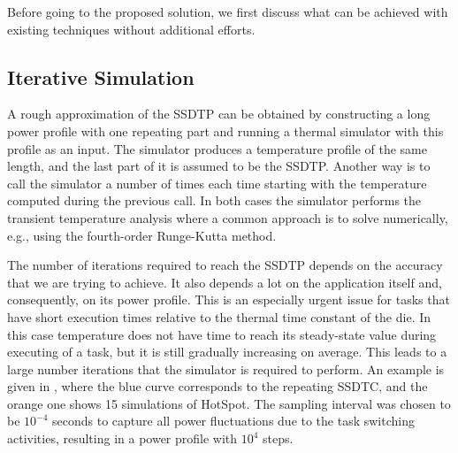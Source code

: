 Before going to the proposed solution, we first discuss what can be achieved with existing techniques without additional efforts.

\subsection{Iterative Simulation}
A rough approximation of the SSDTP can be obtained by constructing a long power profile with one repeating part and running a thermal simulator with this profile as an input. The simulator produces a temperature profile of the same length, and the last part of it is assumed to be the SSDTP. Another way is to call the simulator a number of times each time starting with the temperature computed during the previous call. In both cases the simulator performs the transient temperature analysis where a common approach is to solve  numerically, e.g., using the fourth-order Runge-Kutta method.

The number of iterations required to reach the SSDTP depends on the accuracy that we are trying to achieve. It also depends a lot on the application itself and, consequently, on its power profile. This is an especially urgent issue for tasks that have short execution times relative to the thermal time constant of the die. In this case temperature does not have time to reach its steady-state value during executing of a task, but it is still gradually increasing on average. This leads to a large number iterations that the simulator is required to perform. An example is given in , where the blue curve corresponds to the repeating SSDTC, and the orange one shows 15 simulations of HotSpot. The sampling interval was chosen to be $10^{-4}$ seconds to capture all power fluctuations due to the task switching activities, resulting in a power profile with $10^4$ steps.

